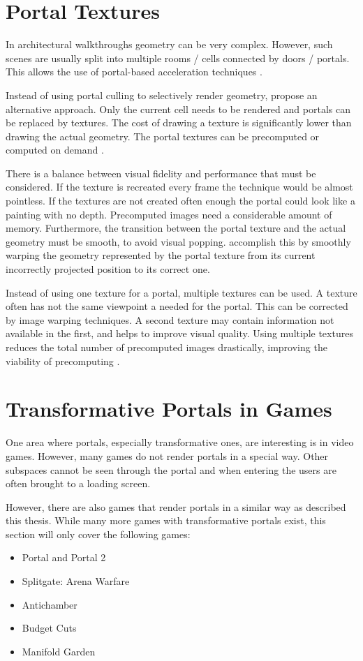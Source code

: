 \section{Portal Textures}
In architectural walkthroughs geometry can be very complex. However, such scenes are usually split into multiple rooms / cells connected by doors / portals. This allows the use of portal-based acceleration techniques \cite{aliaga:1997:architectural}.

Instead of using portal culling to selectively render geometry, \textcite{aliaga:1997:architectural} propose an alternative approach. Only the current cell needs to be rendered and portals can be replaced by textures. The cost of drawing a texture is significantly lower than drawing the actual geometry. The portal textures can be precomputed or computed on demand \cite{aliaga:1997:architectural}. 

There is a balance between visual fidelity and performance that must be considered. If the texture is recreated every frame the technique would be almost pointless. If the textures are not created often enough the portal could look like a painting with no depth. Precomputed images need a considerable amount of memory. Furthermore, the transition between the portal texture and the actual geometry must be smooth, to avoid visual popping. \textcite{aliaga:1997:architectural} accomplish this by smoothly warping the geometry represented by the portal texture from its current incorrectly projected position to its correct one.

Instead of using one texture for a portal, multiple textures can be used. A texture often has not the same viewpoint a needed for the portal. This can be corrected by image warping techniques. A second texture may contain information not available in the first, and helps to improve visual quality. Using multiple textures reduces the total number of precomputed images drastically, improving the viability of precomputing \cite{rafferty:1998:3d}.

\section{Transformative Portals in Games}
One area where portals, especially transformative ones, are interesting is in video games. However, many games do not render portals in a special way. Other subspaces cannot be seen through the portal and when entering the users are often brought to a loading screen. 

However, there are also games that render portals in a similar way as described this thesis. While many more games with transformative portals exist, this section will only cover the following games:
\begin{itemize}
	\item Portal and Portal 2
	\item Splitgate: Arena Warfare
	\item Antichamber
	\item Budget Cuts
	\item Manifold Garden
	
	
\end{itemize}

